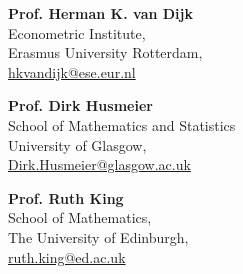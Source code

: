 \documentclass[margin,line]{resume}
\newlength\Colsep
\begin{document}
\begin{resume}
\begin{minipage}[t][6cm][t]{\dimexpr0.5\textwidth-0.5\Colsep\relax}
\textbf{Prof. Herman K. van Dijk} \\  
Econometric Institute,\\  
Erasmus University Rotterdam,\\ \url{hkvandijk@ese.eur.nl}
\end{minipage}
\hfill
\begin{minipage}[t][6cm][t]{\dimexpr0.5\textwidth-0.5\Colsep\relax}
\textbf{Prof. Dirk Husmeier} \\    
School of  Mathematics and Statistics\\
University of Glasgow,\\ \url{Dirk.Husmeier@glasgow.ac.uk}
\vspace{5mm}

\textbf{Prof. Ruth King} \\  
School of Mathematics,\\  
The University of Edinburgh,\\ \url{ruth.king@ed.ac.uk}
\vspace{5mm}



\end{minipage}


\end{resume}
\end{document}
